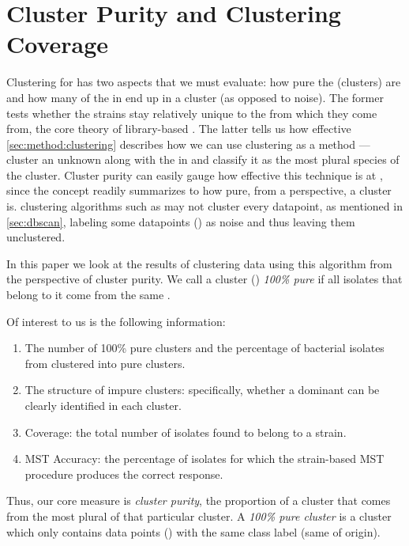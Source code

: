 \section{Cluster Purity and Clustering Coverage}\label{sec:eval:cluster}
Clustering for \bslongs{} has two aspects that we must evaluate: how pure the \bslongs{} (clusters) are and how many of the \isols{} in \cplop{} end up in a cluster (as opposed to noise).
The former tests whether the \ecoli{} strains stay relatively unique to the \spec{} from which they come from, the core theory of library-based \mst{}.
The latter tells us how effective 
\autoref{sec:method:clustering} describes how we can use clustering as a \mst{} method --- cluster an unknown \isol{} along with the \isols{} in \cplop{} and classify it as the most plural species of the cluster.
Cluster purity can easily gauge how effective this technique is at \mst{}, since the concept readily summarizes to how pure, from a \spec{} perspective, a cluster is.
\Dbased{} clustering algorithms such as \dbscan{} may not cluster every datapoint, as mentioned in \autoref{sec:dbscan},  labeling some datapoints (\isols{}) as noise and thus leaving them unclustered.

In this paper we look at the results of clustering \cplop{} data using this algorithm from the perspective of cluster purity. We call a cluster (\bslong{}) \textit{100\% pure}
if all isolates that belong to it come from the same \spec{}. 

Of interest to us is the following information:
\begin{enumerate}
    \item The number of 100\% pure clusters and the percentage of bacterial isolates from \cplop{} clustered into pure clusters.
    \item The structure of impure clusters: specifically, whether a dominant \spec{} can
    be clearly identified in each cluster.
    \item Coverage: the total number of \cplop{} isolates found to belong to a strain.
    \item MST Accuracy: the percentage of isolates for which the strain-based MST procedure produces the correct response.
\end{enumerate}
Thus, our core measure is \textit{cluster purity}, the proportion of a cluster that comes from the most plural \spec{} of that particular cluster.
A \textit{100\% pure cluster} is a cluster which only contains data points (\isols{}) with the same class label (same \spec{} of origin). 

